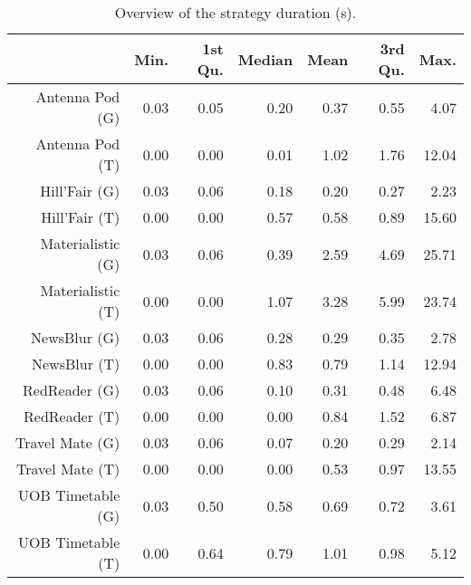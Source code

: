 \begin{table}[ht]
\centering
\begin{tabular}{rrrrrrr}
  \hline
 & Min. & 1st Qu. & Median & Mean & 3rd Qu. & Max. \\ 
  \hline
Antenna Pod (G) & 0.03 & 0.05 & 0.20 & 0.37 & 0.55 & 4.07 \\ 
  Antenna Pod (T) & 0.00 & 0.00 & 0.01 & 1.02 & 1.76 & 12.04 \\ 
  Hill'Fair (G) & 0.03 & 0.06 & 0.18 & 0.20 & 0.27 & 2.23 \\ 
  Hill'Fair (T) & 0.00 & 0.00 & 0.57 & 0.58 & 0.89 & 15.60 \\ 
  Materialistic (G) & 0.03 & 0.06 & 0.39 & 2.59 & 4.69 & 25.71 \\ 
  Materialistic (T) & 0.00 & 0.00 & 1.07 & 3.28 & 5.99 & 23.74 \\ 
  NewsBlur (G) & 0.03 & 0.06 & 0.28 & 0.29 & 0.35 & 2.78 \\ 
  NewsBlur (T) & 0.00 & 0.00 & 0.83 & 0.79 & 1.14 & 12.94 \\ 
  RedReader (G) & 0.03 & 0.06 & 0.10 & 0.31 & 0.48 & 6.48 \\ 
  RedReader (T) & 0.00 & 0.00 & 0.00 & 0.84 & 1.52 & 6.87 \\ 
  Travel Mate (G) & 0.03 & 0.06 & 0.07 & 0.20 & 0.29 & 2.14 \\ 
  Travel Mate (T) & 0.00 & 0.00 & 0.00 & 0.53 & 0.97 & 13.55 \\ 
  UOB Timetable (G) & 0.03 & 0.50 & 0.58 & 0.69 & 0.72 & 3.61 \\ 
  UOB Timetable (T) & 0.00 & 0.64 & 0.79 & 1.01 & 0.98 & 5.12 \\ 
   \hline
\end{tabular}
\caption{Overview of the strategy duration (s).} 
\label{tab:results:rq0:summary:duration_subject}
\end{table}
